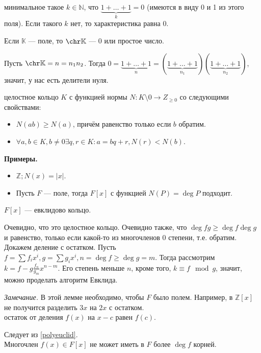 \documentclass[12pt,a4paper]{article}
\begin{document}
 минимальное такое $k\in \mathbb N$, что $\underbrace{1+\ldots +1}_k=0$ (имеются в виду 0 и 1 из этого поля). Если такого $k$ нет, то характеристика равна 0.

\lemma Если $\mathbb K$ --- поле, то $\chr\mathbb K$ --- 0 или простое число.

\proof Пусть $\chr\mathbb K=n=n_1n_2$. Тогда $0=\underbrace{1+\ldots +1}_n=(\underbrace{1+\ldots +1}_{n_1})(\underbrace{1+\ldots +1}_{n_2})$, значит, у нас есть делители нуля.\QEDA\\

\newpage

 целостное кольцо $K$ с функцией нормы $N:K\setminus 0\to Z_{\geq 0}$ со следующими свойствами:

\begin{itemize}
	\item $N(ab)\geq N(a)$, причём равенство только если $b$ обратим.
	\item $\forall a,b\in K,b\neq 0\exists q,r\in K:a=bq+r,N(r)<N(b)$.
\end{itemize}

\textbf{Примеры.}

\begin{itemize}
	\item $\mathbb Z;N(x)=|x|$.
	\item Пусть $F$ --- поле, тогда $F[x]$ с функцией $N(P)=\deg P$ подходит.
\end{itemize}

\lemma $F[x]$ --- евклидово кольцо.\label{polyeuclid}

\proof Очевидно, что это целостное кольцо. Очевидно также, что $\deg fg\geq \deg f\deg g$ и равенство, только если какой-то из многочленов 0 степени, т.е. обратим. Докажем деление с остатком. Пусть $f=\sum f_ix^i,g=\sum g_ix^i,n=\deg f\geq \deg g=m$. Тогда рассмотрим $k=f-g\frac{f_n}{g_m}x^{n-m}$. Его степень меньше $n$, кроме того, $k\equiv f\mod g$, значит, можно проделать алгоритм Евклида. \QEDA

\textit{Замечание.} В этой лемме необходимо, чтобы $F$ было полем. Например, в $\mathbb Z[x]$ не получится разделить $3x$ на $2x$ с остатком.\\

 остаток от деления $f(x)$ на $x-c$ равен $f(c)$.

\proof Следует из \ref{polyeuclid}.\QEDA\\

\theorem Многочлен $f(x)\in F[x]$ не может иметь в $F$ более $\deg f$ корней.
\end{document}
